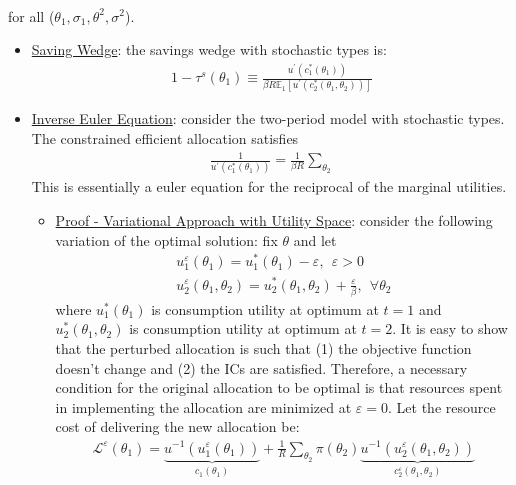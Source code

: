\documentclass{article}
\begin{document}
\begin{itemize}
\begin{gather*}
     \end{gather*}
     for all ($\theta_{1}, \sigma_{1}, \theta^{2}, \sigma^{2}$).
     \begin{itemize}
         \item  \underline{Saving Wedge}: the savings wedge with stochastic types is:
         \begin{gather*}
             1 - \tau^{s}(\theta_{1}) \equiv \frac{u^{'}(c_{1}^{*}(\theta_{1}))}{\beta R \mathbb{E}_{1}[u^{'}(c_{2}^{*}(\theta_{1},\theta_{2}))]}
         \end{gather*}
         \item  \underline{Inverse Euler Equation}: consider the two-period model with stochastic types. The constrained efficient allocation satisfies
         \begin{gather*}
             \frac{1}{u^{'}(c_{1}^{*}(\theta_{1}))} = \frac{1}{\beta R} \sum_{\theta_{2}}
         \end{gather*}
         This is essentially a euler equation for the reciprocal of the marginal utilities.
         \begin{itemize}
             \item  \underline{Proof - Variational Approach with Utility Space}: consider the following variation of the optimal solution: fix $\theta$ and let
             \begin{gather*}
                 u_{1}^{\varepsilon}(\theta_{1}) = u_{1}^{*}(\theta_{1}) - \varepsilon, \ \ \varepsilon > 0 \\
                 u_{2}^{\varepsilon}(\theta_{1}, \theta_{2}) = u_{2}^{*} (\theta_{1}, \theta_{2}) + \frac{\varepsilon}{\beta}, \ \ \forall \theta_{2}
             \end{gather*}
             where $u_{1}^{*}(\theta_{1})$ is consumption utility at optimum at $t=1$ and $u_{2}^{*}(\theta_{1}, \theta_{2})$ is consumption utility at optimum at $t=2$. It is easy to show that the perturbed allocation is such that (1) the objective function doesn't change and (2) the ICs are satisfied. Therefore, a necessary condition for the original allocation to be optimal is that resources spent in implementing the allocation are minimized at $\varepsilon = 0$. Let the resource cost of delivering the new allocation be:
             \begin{gather*}
                 \mathcal{L}^{\varepsilon}(\theta_{1}) = \underbrace{u^{-1}(u_{1}^{\varepsilon}(\theta_{1}))}_{c_{1}(\theta_{1})} + \frac{1}{R} \sum_{\theta_{2}} \pi (\theta_{2}) \underbrace{u^{-1}(u_{2}^{\varepsilon}(\theta_{1},\theta_{2}))}_{c_{2}^{\varepsilon}(\theta_{1}, \theta_{2})}

\end{gather*}
\end{itemize}
\end{itemize}
\end{itemize}
\end{document}
